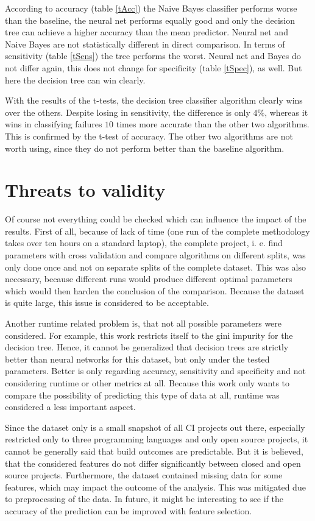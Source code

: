 \documentclass[a4paper,11pt]{article}
\begin{document}
According to accuracy (table \ref{tAcc}) the Naive Bayes classifier performs worse than the baseline, the neural net performs equally good and only the decision tree can achieve a higher accuracy than the mean predictor. Neural net and Naive Bayes are not statistically different in direct comparison. 
In terms of sensitivity (table \ref{tSens}) the tree performs the worst. Neural net and Bayes do not differ again, this does not change for specificity (table \ref{tSpec}), as well. But here the decision tree can win clearly.

With the results of the t-tests, the decision tree classifier algorithm clearly wins over the others. Despite losing in sensitivity, the difference is only $4\%$, whereas it wins in classifying failures $10$ times more accurate than the other two algorithms. This is confirmed by the t-test of accuracy. The other two algorithms are not worth using, since they do not perform better than the baseline algorithm. 

\section{Threats to validity}

Of course not everything could be checked which can influence the impact of the results. First of all, because of lack of time (one run of the complete methodology takes over ten hours on a standard laptop), the complete project, i. e. find parameters with cross validation and compare algorithms on different splits, was only done once and not on separate splits of the complete dataset. This was also necessary, because different runs would produce different optimal parameters which would then harden the conclusion of the comparison. Because the dataset is quite large, this issue is considered to be acceptable. 

Another runtime related problem is, that not all possible parameters were considered. For example, this work restricts itself to the gini impurity for the decision tree. Hence, it cannot be generalized that decision trees are strictly better than neural networks for this dataset, but only under the tested parameters. Better is only regarding accuracy, sensitivity and specificity and not considering runtime or other metrics at all. Because this work only wants to compare the possibility of predicting this type of data at all, runtime was considered a less important aspect. 

Since the dataset only is a small snapshot of all CI projects out there, especially restricted only to three programming languages and only open source projects, it cannot be generally said that build outcomes are predictable. But it is believed, that the considered features do not differ significantly between closed and open source projects. Furthermore, the dataset contained missing data for some features, which may impact the outcome of the analysis. This was mitigated due to preprocessing of the data. In future, it might be interesting to see if the accuracy of the prediction can be improved with feature selection. 
\end{document}
